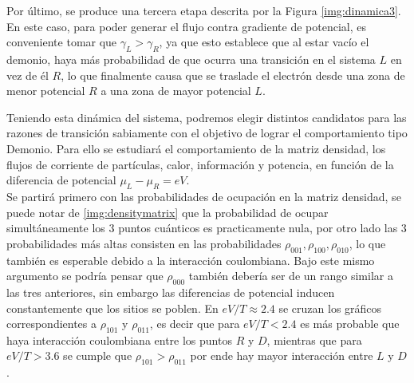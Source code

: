 Por último, se produce una tercera etapa descrita por la Figura \ref{img:dinamica3}. En este caso, para poder generar el flujo contra gradiente de potencial, es conveniente tomar que $\gamma_{L}>\gamma_{R}$, ya que esto establece que al estar vacío el demonio, haya más probabilidad de que ocurra una transición en el sistema $L$ en vez de él $R$, lo que finalmente causa que se traslade el electrón desde una zona de menor potencial $R$ a una zona de mayor potencial $L$.


Teniendo esta dinámica del sistema, podremos elegir distintos candidatos para las razones de transición sabiamente con el objetivo de lograr el comportamiento tipo Demonio. Para ello se estudiará el comportamiento de la matriz densidad, los flujos de corriente de partículas, calor, información y potencia, en función de la diferencia de potencial $\mu_{L}-\mu_{R}=eV$. \\
Se partirá primero con las probabilidades de ocupación en la matriz densidad, se puede notar de \ref{img:densitymatrix} que la probabilidad de ocupar simultáneamente los 3 puntos cuánticos es practicamente nula, por otro lado las 3 probabilidades más altas consisten en las probabilidades $\rho_{001},\rho_{100},\rho_{010}$, lo que también es esperable debido a la interacción coulombiana. Bajo este mismo argumento se podría pensar que $\rho_{000}$ también debería ser de un rango similar a las tres anteriores, sin embargo las diferencias de potencial inducen constantemente que los sitios se poblen. En $eV/T \approx 2.4$ se cruzan los gráficos correspondientes a $\rho_{101}$ y $\rho_{011}$, es decir que para $eV/T<2.4$ es más probable que haya interacción coulombiana entre los puntos $R$ y $D$, mientras que para $eV/T>3.6$ se cumple que $\rho_{101}>\rho_{011}$ por ende hay mayor interacción entre $L$ y $D$.



